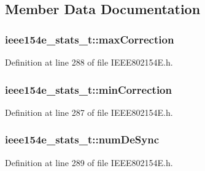 \subsection{Member Data Documentation}
\subsubsection[{\texorpdfstring{max\+Correction}{maxCorrection}}]{ ieee154e\+\_\+stats\+\_\+t\+::max\+Correction}\hypertarget{structieee154e__stats__t_a4f0a358ac0d4f89838ae2ef69ce380c1}{}\label{structieee154e__stats__t_a4f0a358ac0d4f89838ae2ef69ce380c1}


Definition at line 288 of file I\+E\+E\+E802154\+E.\+h.

\subsubsection[{\texorpdfstring{min\+Correction}{minCorrection}}]{ ieee154e\+\_\+stats\+\_\+t\+::min\+Correction}\hypertarget{structieee154e__stats__t_a8253418a2af45a50377da92e7cc6a9de}{}\label{structieee154e__stats__t_a8253418a2af45a50377da92e7cc6a9de}


Definition at line 287 of file I\+E\+E\+E802154\+E.\+h.

\subsubsection[{\texorpdfstring{num\+De\+Sync}{numDeSync}}]{ ieee154e\+\_\+stats\+\_\+t\+::num\+De\+Sync}\hypertarget{structieee154e__stats__t_a3997879f2b9023357f6f522999353f7b}{}\label{structieee154e__stats__t_a3997879f2b9023357f6f522999353f7b}


Definition at line 289 of file I\+E\+E\+E802154\+E.\+h.

